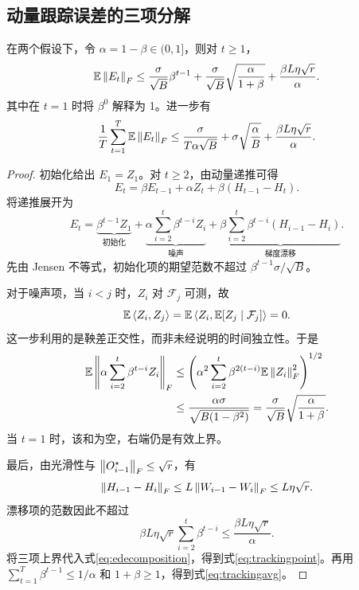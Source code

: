 \subsection{动量跟踪误差的三项分解}
\begin{lemma}[误差递推与平均界]\label{lem:tracking}
在两个假设下，令 $\alpha=1-\beta\in(0,1]$，则对 $t\geq1$，
\begin{equation}\label{eq:trackingpoint}
 \mathbb E\left\lVert E_t\right\rVert_F\leq
 \frac{\sigma}{\sqrt B}\beta^{t-1}
 +\frac{\sigma}{\sqrt B}\sqrt{\frac{\alpha}{1+\beta}}
 +\frac{\beta L\eta\sqrt r}{\alpha}.
\end{equation}
其中在 $t=1$ 时将 $\beta^0$ 解释为 1。进一步有
\begin{equation}\label{eq:trackingavg}
 \frac1T\sum_{t=1}^T\mathbb E\left\lVert E_t\right\rVert_F\leq
 \frac{\sigma}{T\alpha\sqrt B}
 +\sigma\sqrt{\frac{\alpha}{B}}
 +\frac{\beta L\eta\sqrt r}{\alpha}.
\end{equation}
\end{lemma}
\begin{proof}
初始化给出 $E_1=Z_1$。对 $t\geq2$，由动量递推可得
\begin{equation}\label{eq:erecursion}
 E_t=\beta E_{t-1}+\alpha Z_t+\beta(H_{t-1}-H_t).
\end{equation}
将递推展开为
\begin{equation}\label{eq:edecomposition}
 E_t=\underbrace{\beta^{t-1}Z_1}_{\text{初始化}}
 +\underbrace{\alpha\sum_{i=2}^t\beta^{t-i}Z_i}_{\text{噪声}}
 +\underbrace{\beta\sum_{i=2}^t\beta^{t-i}(H_{i-1}-H_i)}_{\text{梯度漂移}}.
\end{equation}
先由 Jensen 不等式，初始化项的期望范数不超过 $\beta^{t-1}\sigma/\sqrt B$。

对于噪声项，当 $i<j$ 时，$Z_i$ 对 $\mathcal F_j$ 可测，故
\begin{equation}
 \mathbb E\left\langle Z_i,Z_j\right\rangle
 =\mathbb E\left\langle Z_i,\mathbb E[Z_j\mid\mathcal F_j]\right\rangle=0.
\end{equation}
这一步利用的是鞅差正交性，而非未经说明的时间独立性。于是
\begin{align}
 \mathbb E\left\lVert\alpha\sum_{i=2}^t\beta^{t-i}Z_i\right\rVert_F
 &\leq\left(\alpha^2\sum_{i=2}^t\beta^{2(t-i)}\mathbb E\left\lVert Z_i\right\rVert_F^2\right)^{1/2}\notag\\
 &\leq\frac{\alpha\sigma}{\sqrt{B(1-\beta^2)}}
 =\frac{\sigma}{\sqrt B}\sqrt{\frac{\alpha}{1+\beta}}.\label{eq:noisesum}
\end{align}
当 $t=1$ 时，该和为空，右端仍是有效上界。

最后，由光滑性与 $\left\lVert O_{i-1}^\star\right\rVert_F\leq\sqrt r$，有
\begin{equation}
 \left\lVert H_{i-1}-H_i\right\rVert_F\leq L\left\lVert W_{i-1}-W_i\right\rVert_F
 \leq L\eta\sqrt r.
\end{equation}
漂移项的范数因此不超过
\begin{equation}\label{eq:drift}
 \beta L\eta\sqrt r\sum_{i=2}^t\beta^{t-i}
 \leq\frac{\beta L\eta\sqrt r}{\alpha}.
\end{equation}
将三项上界代入式\eqref{eq:edecomposition}，得到式\eqref{eq:trackingpoint}。再用 $\sum_{t=1}^T\beta^{t-1}\leq1/\alpha$ 和 $1+\beta\geq1$，得到式\eqref{eq:trackingavg}。
\end{proof}

